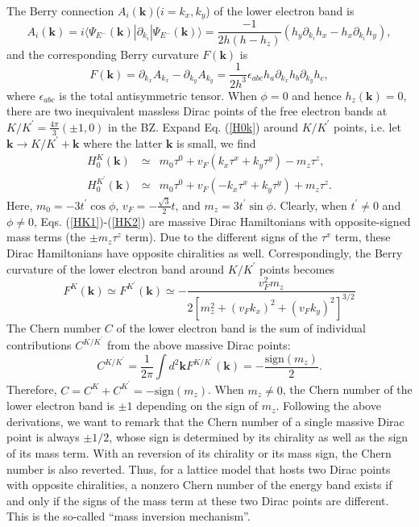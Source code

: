 \documentclass[amsmath,superscriptaddress,showpacs,aps,prl,twocolumn]{revtex4-1}
\begin{document}
The Berry connection $A_i(\mathbf{k})$($i=k_x,k_y$) of the lower electron band is
\begin{equation*}
A_i(\mathbf{k}) = i\langle\Psi_{E^-}(\mathbf{k})|\partial_{k_i}|\Psi_{E^-}(\mathbf{k})\rangle
                         = \frac{-1}{2h\left(h-h_z\right)}\left(h_y\partial_{k_i}h_x-h_x\partial_{k_i}h_y\right),
\end{equation*}
and the corresponding Berry curvature $F(\mathbf{k})$ is
\begin{equation*}
F(\mathbf{k}) = \partial_{k_x}A_{k_x}-\partial_{k_y}A_{k_y}
              = \frac{1}{2h^3}\epsilon_{abc}h_a\partial_{k_x}h_b\partial_{k_y}h_c,
\end{equation*}
where $\epsilon_{abc}$ is the total antisymmetric tensor. When $\phi=0$ and hence $h_z(\mathbf{k})=0$, there are two inequivalent massless Dirac points of the free electron bands at $K/K^\prime=\frac{4\pi}{3}(\pm1,0)$ in the BZ. Expand Eq. (\ref{H0k}) around $K/K^\prime$ points, i.e. let $\mathbf{k}\rightarrow K/K^\prime+\mathbf{k}$ where the latter $\mathbf{k}$ is small, we find
\begin{eqnarray}
H_0^K(\mathbf{k})          &\simeq& m_0\tau^0+v_F\left(k_x\tau^x+k_y\tau^y\right)-m_z\tau^z, \label{HK1} \\
H_0^{K^\prime}(\mathbf{k}) &\simeq& m_0\tau^0+v_F\left(-k_x\tau^x+k_y\tau^y\right)+m_z\tau^z. \label{HK2}
\end{eqnarray}
Here, $m_0=-3t^\prime\cos\phi$, $v_F=-\frac{\sqrt{3}}{2}t$, and $m_z=3t^\prime\sin\phi$. Clearly, when $t^\prime\ne0$ and $\phi\ne0$, Eqs. (\ref{HK1})-(\ref{HK2}) are massive Dirac Hamiltonians with opposite-signed mass terms (the $\pm m_z\tau^z$ term). Due to the different signs of the $\tau^x$ term, these Dirac Hamiltonians have opposite chiralities as well. Correspondingly, the Berry curvature of the lower electron band around $K/K^\prime$ points becomes
\begin{equation*}
F^K(\mathbf{k})\simeq F^{K^\prime}(\mathbf{k})\simeq-\frac{v_F^2m_z}{2\left[m_z^2+(v_Fk_x)^2+(v_Fk_y)^2\right]^{3/2}}
\end{equation*}
The Chern number $C$ of the lower electron band is the sum of individual contributions $C^{K/K^\prime}$ from the above massive Dirac points:
\begin{equation*}
C^{K/K^\prime}=\frac{1}{2\pi}\int d^2\mathbf{k} F^{K/K^\prime}(\mathbf{k})=-\frac{\text{sign}(m_z)}{2}.
\end{equation*}
Therefore, $C=C^K+C^{K^\prime}=-\text{sign}(m_z)$. When $m_z\ne0$, the Chern number of the lower electron band is $\pm1$ depending on the sign of $m_z$. Following the above derivations, we want to remark that the Chern number of a single massive Dirac point is always $\pm1/2$, whose sign is determined by its chirality as well as the sign of its mass term. With an reversion of its chirality or its mass sign, the Chern number is also reverted. Thus, for a lattice model that hosts two Dirac points with opposite chiralities, a nonzero Chern number of the energy band exists if and only if the signs of the mass term at these two Dirac points are different. This is the so-called ``mass inversion mechanism''.
\end{document}
